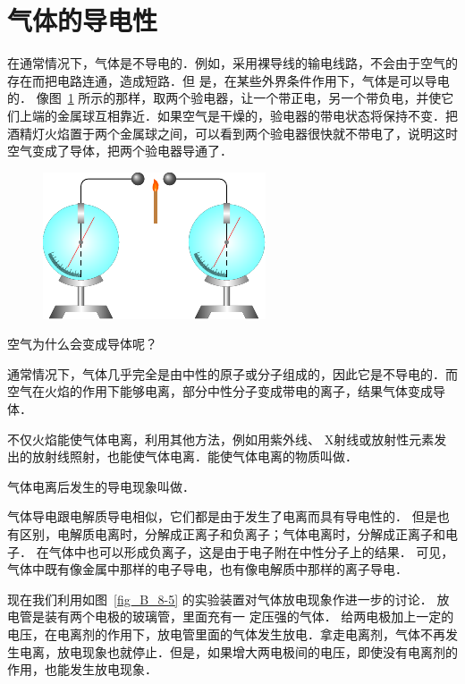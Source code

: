 \section{气体的导电性}
在通常情况下，气体是不导电的．例如，采用裸导线的输电线路，不会由于空气的存在而把电路连通，造成短路．但
是，在某些外界条件作用下，气体是可以导电的．
像图~\ref{fig_B_8-4} 所示的那样，取两个验电器，让一个带正电，另一个带负电，并使它们上端的金属球互相靠近．如果空气是干燥的，验电器的带电状态将保持不变．把酒精灯火焰置于两个金属球之间，可以看到两个验电器很快就不带电了，说明这时空气变成了导体，把两个验电器导通了．
\begin{figure}[htbp]
    \centering
    \includegraphics{fig/B/8-4.pdf}
    \caption{}\label{fig_B_8-4}
\end{figure}

空气为什么会变成导体呢？

通常情况下，气体几乎完全是由中性的原子或分子组成的，因此它是不导电的．而空气在火焰的作用下能够电离，部分中性分子变成带电的离子，结果气体变成导体．

不仅火焰能使气体电离，利用其他方法，例如用紫外线、
X射线或放射性元素发出的放射线照射，也能使气体电离．能使气体电离的物质叫做．

气体电离后发生的导电现象叫做．

气体导电跟电解质导电相似，它们都是由于发生了电离而具有导电性的．
但是也有区别，电解质电离时，分解成正离子和负离子；气体电离时，分解成正离子和电子．
在气体中也可以形成负离子，这是由于电子附在中性分子上的结果．
可见，气体中既有像金属中那样的电子导电，也有像电解质中那样的离子导电．

现在我们利用如图~\ref{fig_B_8-5} 的实验装置对气体放电现象作进一步的讨论．
放电管是装有两个电极的玻璃管，里面充有一
定压强的气体．
给两电极加上一定的电压，在电离剂的作用下，放电管里面的气体发生放电．拿走电离剂，气体不再发生电离，放电现象也就停止．但是，如果增大两电极间的电压，即使没有电离剂的作用，也能发生放电现象．

